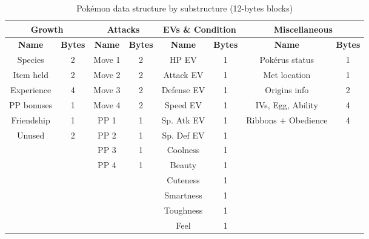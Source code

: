 \documentclass[a4paper]{usiinfbachelorproject}
\begin{document}
\begin{table}
	\begin{center}
		\begin{tabular}{|c|c||c|c||c|c||c|c|}
			\hline
			\multicolumn{2}{|c||}{\textbf{Growth}}          &
			\multicolumn{2}{c||}{\textbf{Attacks}}          &
			\multicolumn{2}{c||}{\textbf{EVs \& Condition}} &
			\multicolumn{2}{c|}{\textbf{Miscellaneous}}                                                                              \\
			\hline
			\textbf{Name}                                   & \textbf{Bytes} &
			\textbf{Name}                                   & \textbf{Bytes} &
			\textbf{Name}                                   & \textbf{Bytes} &
			\textbf{Name}                                   & \textbf{Bytes}                                                         \\
			\hline
			Species                                         & 2              & Move 1 & 2 & HP EV      & 1 & Pokérus status      & 1 \\
			Item held                                       & 2              & Move 2 & 2 & Attack EV  & 1 & Met location        & 1 \\
			Experience                                      & 4              & Move 3 & 2 & Defense EV & 1 & Origins info        & 2 \\
			PP bonuses                                      & 1              & Move 4 & 2 & Speed EV   & 1 & IVs, Egg, Ability   & 4 \\
			Friendship                                      & 1              & PP 1   & 1 & Sp. Atk EV & 1 & Ribbons + Obedience & 4 \\
			Unused                                          & 2              & PP 2   & 1 & Sp. Def EV & 1 &                     &   \\
			                                                &                & PP 3   & 1 & Coolness   & 1 &                     &   \\
			                                                &                & PP 4   & 1 & Beauty     & 1 &                     &   \\
			                                                &                &        &   & Cuteness   & 1 &                     &   \\
			                                                &                &        &   & Smartness  & 1 &                     &   \\
			                                                &                &        &   & Toughness  & 1 &                     &   \\
			                                                &                &        &   & Feel       & 1 &                     &   \\
			\hline
		\end{tabular}
		\caption{Pokémon data structure by substructure (12-bytes blocks)}
		\label{table:pokemon-data-structure}
	\end{center}
\end{table}
\end{document}
